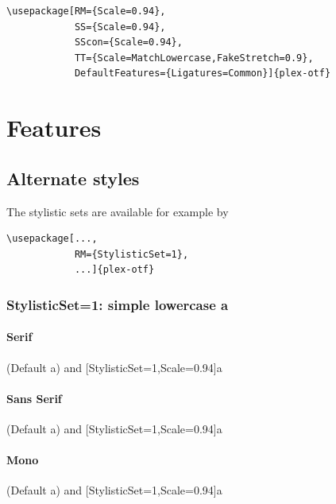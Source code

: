 \documentclass[fontsize=11pt,paper=a4,twoside=on,abstract=on,usegeometry]{scrartcl}
\begin{document}
\begin{verbatim}
\usepackage[RM={Scale=0.94},
            SS={Scale=0.94},
            SScon={Scale=0.94},
            TT={Scale=MatchLowercase,FakeStretch=0.9},
            DefaultFeatures={Ligatures=Common}]{plex-otf}
\end{verbatim}







\section{Features}


\subsection{Alternate styles}

The stylistic sets are available for example by 

\begin{verbatim}
\usepackage[...,
            RM={StylisticSet=1},
            ...]{plex-otf}
\end{verbatim}




\subsubsection{StylisticSet=1: simple lowercase a}
\paragraph{Serif}
{(Default a) and 
[StylisticSet=1,Scale=0.94]a%
}

\paragraph{Sans Serif}
{\sffamily (Default a) and 
[StylisticSet=1,Scale=0.94]a%
}

\paragraph{Mono}
{\ttfamily (Default a) and 
[StylisticSet=1,Scale=0.94]a%
}
\end{document}
